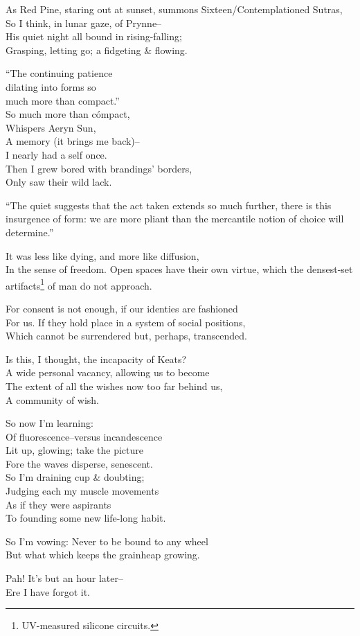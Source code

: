 
As Red Pine, staring out at sunset, summons Sixteen\-/Contemplationed Sutras, \\
So I think, in lunar gaze, of Prynne-- \\
His quiet night all bound in rising-falling; \\
Grasping, letting go; a fidgeting \& flowing.

``The continuing patience \\
dilating into forms so \\
much more than compact.'' \\

So much more than cómpact, \\
Whispers Aeryn Sun, \\
A memory (it brings me back)-- \\
I nearly had a self once. \\
Then I grew bored with brandings' borders, \\
Only saw their wild lack.

``The quiet
suggests that the act taken
extends so much further, there
is this insurgence of form:
we are more pliant than the mercantile notion 
of choice will determine.''

It was less like dying, and more like diffusion, \\
In the sense of freedom. Open spaces have their own virtue, which the densest-set artifacts\footnote{UV-measured silicone circuits.} of man do not approach.

For consent is not enough, if our identies are fashioned \\
For us. If they hold place in a system of social positions, \\
Which cannot be surrendered but, perhaps, transcended.

Is this, I thought, the incapacity of Keats? \\
A wide personal vacancy, allowing us to become \\
The extent of all the wishes now too far behind us, \\
A community of wish.

So now I'm learning: \\
Of fluorescence--versus incandescence \\
Lit up, glowing; take the picture \\
Fore the waves disperse, senescent. \\
So I'm draining cup \& doubting; \\
Judging each my muscle movements \\
As if they were aspirants \\
To founding some new life-long habit.

So I'm vowing: Never to be bound to any wheel \\
But what which keeps the grainheap growing.

\secdiv

Pah! It's but an hour later-- \\
Ere I have forgot it.